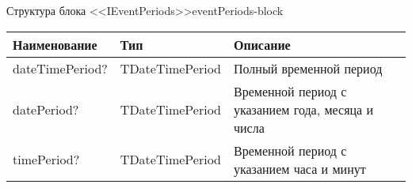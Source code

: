 \begin{tblh}{Структура блока <<IEventPeriods>>}{eventPeriods-block}
  \begin{tabularx}{\textwidth}{| p{3cm} | p{6cm} | X |}
  \hline Наименование    & Тип             & Описание                                          \\
  \hline dateTimePeriod? & TDateTimePeriod & Полный временной период                           \\
  \hline datePeriod?     & TDateTimePeriod & Временной период с указанием года, месяца и числа \\
  \hline timePeriod?     & TDateTimePeriod & Временной период с указанием часа и минут         \\
  \hline
  \end{tabularx}
\end{tblh}

\clearpage